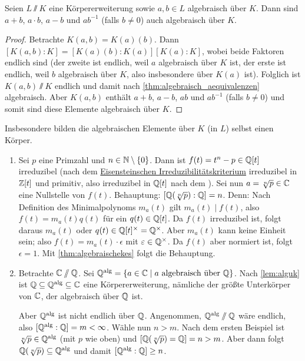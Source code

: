 \documentclass[12pt,a4paper]{scrartcl}
\begin{document}
\begin{lem}\label{lem:alguk}
	Seien $L\sslash K$ eine Körpererweiterung sowie $a,b\in L$ algebraisch über $K$. Dann sind $a+b$, $a\cdot b$, $a-b$ und $ab^{-1}$ (falls $b\neq 0$) auch algebraisch über $K$.
\end{lem}
\begin{proof}
	Betrachte $K(a,b) = K(a)(b)$. Dann $[K(a,b):K] = [K(a)(b):K(a)][K(a):K]$, wobei beide Faktoren endlich sind (der zweite ist endlich, weil $a$ algebraisch über $K$ ist, der erste ist endlich, weil $b$ algebraisch über $K$, also insbesondere über $K(a)$ ist). Folglich ist $K(a,b)\sslash K$ endlich und damit nach \cref{thm:algebraisch_aequivalenzen} algebraisch. Aber $K(a,b)$ enthält $a+b$, $a-b$, $ab$ und $ab^{-1}$ (falls $b\neq 0$) und somit sind diese Elemente algebraisch über $K$.
\end{proof}

\begin{bem}
	Insbesondere bilden die algebraischen Elemente über $K$ (in $L$) selbst einen Körper.
\end{bem}
	
\begin{bsp}
	\leavevmode
	\begin{enumerate}
	\item Sei $p$ eine Primzahl und $n \in\mathbb N\setminus\{0\}$. Dann ist $f(t) = t^n-p\in \mathbb Q[t]$ irreduzibel (nach dem \hyperref[thm:eisenstein]{Eisensteinschen Irreduzibilitätskriterium} irreduzibel in $\mathbb Z[t]$ und primitiv, also irreduzibel in $\mathbb Q[t]$ nach dem ).
	Sei nun $a = \sqrt[n]{p}\in\mathbb C$ eine Nullstelle von $f(t)$. Behauptung: $[\mathbb Q(\sqrt[n]{p}): \mathbb Q] = n$. Denn: Nach Definition des Minimalpolynoms $m_a(t)$ gilt $m_a(t)\mid f(t)$, also $f(t) = m_a(t)q(t)$ für ein $q(t)\in\mathbb Q[t]$. Da $f(t)$ irreduzibel ist, folgt daraus $m_a(t)$ oder $q(t)\in \mathbb Q[t]^{\times} = \mathbb Q^{\times}$. Aber $m_a(t)$ kann keine Einheit sein; also $f(t) = m_a(t)\cdot \epsilon$ mit $\varepsilon\in \mathbb Q^{\times}$. Da $f(t)$ aber normiert ist, folgt $\epsilon = 1$. Mit \cref{thm:algebraischekes} folgt die Behauptung.
	\item\label{enumi:IQalgkoerp} Betrachte $\mathbb C\sslash \mathbb Q$. Sei $\mathbb Q^{\text{alg}} = \{a\in\mathbb C\mid a\text{ algebraisch über }\mathbb Q\}$. Nach \cref{lem:alguk} ist $\mathbb Q\subseteq\mathbb Q^{\text{alg}}\subseteq \mathbb C$ eine Körpererweiterung, nämliche der größte Unterkörper von $\mathbb C$, der algebraisch über $\mathbb Q$ ist.
	
	Aber $\mathbb Q^{\text{alg}}$ ist nicht endlich über $\mathbb Q$. Angenommen, $\mathbb Q^{\text{alg}}\sslash \mathbb Q$ wäre endlich, also $[\mathbb Q^{\text{alg}}:\mathbb Q] = m<\infty$. Wähle nun $n>m$. Nach dem ersten Beispiel ist $\sqrt[n]p \in \mathbb Q^{\text{alg}}$ (mit $p$ wie oben) und $[\mathbb Q(\sqrt[n]p) = \mathbb Q] = n > m$. Aber dann folgt $\mathbb Q(\sqrt[n]p)\subseteq \mathbb Q^{\text{alg}}$ und damit $[\mathbb Q^{\text{alg}}:\mathbb Q]\geq n$.
	\end{enumerate}
\end{bsp}
\end{document}
